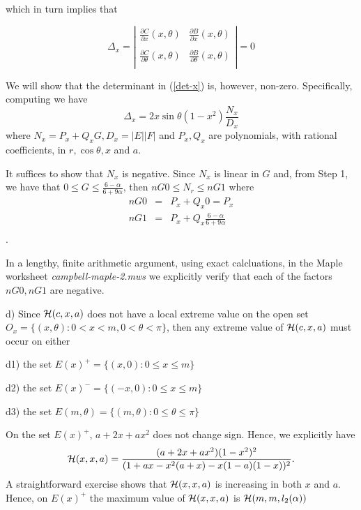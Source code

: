 \documentclass[12pt]{article}
\newcommand{\ds}{\displaystyle}
\begin{document}
which in turn implies that 

\begin{equation} \label{det-x}
\Delta_x = 
\left |
\begin{array}{ll}
\frac{\partial {C}}{\partial x}{(x,\theta)} & \frac{\partial {B}}{\partial x}{(x,\theta)} \\
& \\
\frac{\partial {C}}{\partial \theta}{(x,\theta)} & \frac{\partial {B}}{\partial \theta}{(x,\theta)} \\
\end{array}
\right | = 0
\end{equation}

\vspace{0.1in}

We will show that the determinant in (\ref{det-x}) is, however, non-zero.  Specifically, computing we have
$$
\Delta_x = 2 x \sin \theta (1-x^2) \frac{N_x}{D_x} 
$$
where $N_x = P_x + Q_x G, D_x = |E| |F|$
and $P_x, Q_x$ are polynomials, with rational coefficients, in $r, \cos \theta, x$ and $a$.

It suffices to show that $N_x$ is negative. Since $N_x$ is linear in $G$ and, from Step 1, we have that 
${\ds 0 \le G \le \frac{6-\alpha}{6+9\alpha} }$, then $nG0 \le N_r \le nG1$
where
\begin{eqnarray*}
nG0 &=& P_x + Q_x 0  = P_x\\
nG1 &=& P_x + Q_x \frac{6-\alpha}{6+9\alpha} \\
\end{eqnarray*}.

In a lengthy, finite arithmetic argument, using exact calcluations, in the Maple worksheet {\em campbell-maple-2.mws} we explicitly verify that each of the factors $nG0, nG1$ are negative.

d) Since ${\cal H}(c,x,a)$ does not have a local extreme value on the open 
set $O_x = \{(x,\theta) : 0 < x < m, 0 < \theta < \pi \}$, then any extreme value of ${\cal H}(c,x,a)$ must occur on either 

d1) the set $E(x)^{+} = \{(x,0) : 0 \le x \le m \}$

d2) the set $E(x)^{-} =\{(-x,0) : 0 \le x \le m \}$

d3) the set $E(m,\theta) = \{(m,\theta) : 0 \le \theta \le \pi \}$

\vspace{0.1in}

\vspace{0.1in}

On the set $E(x)^{+}$, $a + 2x + ax^2$ does not change sign.  Hence, we explicitly have
$$
{\cal H}(x,x,a) = \frac{(a+2x+ax^2)(1-x^2)^2}{( 1 + ax-x^2(a+x) - x(1-a)(1-x) )^2} .
$$
A straightforward exercise shows that ${\cal H}(x,x,a)$ is increasing in both $x$ and $a$.  Hence, 
on $E(x)^{+}$ the maximum value of ${\cal H}(x,x,a)$ is ${\cal H}(m,m,l_2(\alpha))$ 
\end{document}

